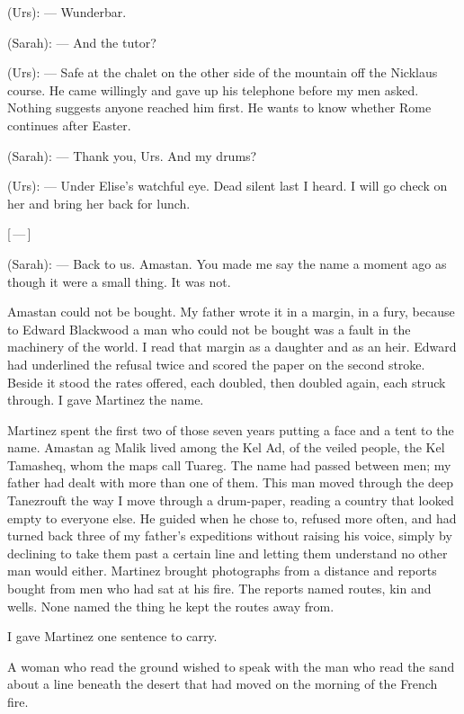 \begin{room}
(Urs): --- Wunderbar.

(Sarah): --- And the tutor?

(Urs): --- Safe at the chalet on the other side of the mountain off the Nicklaus course. He came willingly and gave up his telephone before my men asked. Nothing suggests anyone reached him first. He wants to know whether Rome continues after Easter.

(Sarah): --- Thank you, Urs. And my drums?

(Urs): --- Under Elise's watchful eye. Dead silent last I heard. I will go check on her and bring her back for lunch.

\centerline{[\,---\,]}

(Sarah): --- Back to us. Amastan. You made me say the name a moment ago as though it were a small thing. It was not.

\end{room}

Amastan could not be bought. My father wrote it in a margin, in a fury, because to Edward Blackwood a man who could not be bought was a fault in the machinery of the world. I read that margin as a daughter and as an heir. Edward had underlined the refusal twice and scored the paper on the second stroke. Beside it stood the rates offered, each doubled, then doubled again, each struck through. I gave Martinez the name.\par

Martinez spent the first two of those seven years putting a face and a tent to the name. Amastan ag Malik lived among the Kel Ad, of the veiled people, the Kel Tamasheq, whom the maps call Tuareg. The name had passed between men; my father had dealt with more than one of them. This man moved through the deep Tanezrouft the way I move through a drum-paper, reading a country that looked empty to everyone else. He guided when he chose to, refused more often, and had turned back three of my father's expeditions without raising his voice, simply by declining to take them past a certain line and letting them understand no other man would either. Martinez brought photographs from a distance and reports bought from men who had sat at his fire. The reports named routes, kin and wells. None named the thing he kept the routes away from.\par

I gave Martinez one sentence to carry.\par

\begin{scripture}
A woman who read the ground wished to speak with the man who read the sand about a line beneath the desert that had moved on the morning of the French fire.
\end{scripture}

